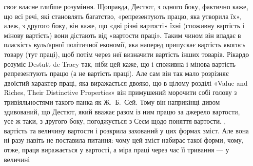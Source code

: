 {своє власне глибше розуміння. Щоправда, Дестют, з одного боку, фактично каже, що всі речі, які
становлять багатство, «репрезентують працю, яка утворила їх», алеж, з другого боку, він каже, що
«дві різні вартості» їхні (споживну вартість і мінову вартість) вони дістають від «вартости праці».
Таким чином він впадає в пласкість вульґарної політичної економії, яка наперед припускає вартість
якогось товару (тут праці), щоб потім через неї визначити вартість інших товарів. Рікардо розуміє
Destutt de Tracy так, ніби цей каже, що і споживна і мінова вартість репрезентують працю (а не
вартість праці). Але сам він так мало розрізняє двоїстий характер праці, яка виражається двояко, що
в цілому розділі «Value and Riches, Their Distinctive Properties» він примушений морочити собі
голову з тривіяльностями такого панка як Ж.~Б.~Сей. Тому він наприкінці дивом здивований, що Дестют,
який вважає разом із ним працю за джерело вартости, усе ж таки, з другого боку, погоджується з Сеєм
щодо поняття вартости.
}, вартість та величину вартости і
розкрила захований у цих формах зміст. Але вона ні разу навіть не поставила питання: чому цей зміст
набирає такої форми, чому, отже, праця виражається у вартості, а міра праці через час її тривання —
у величині
\parbreak{}  %
